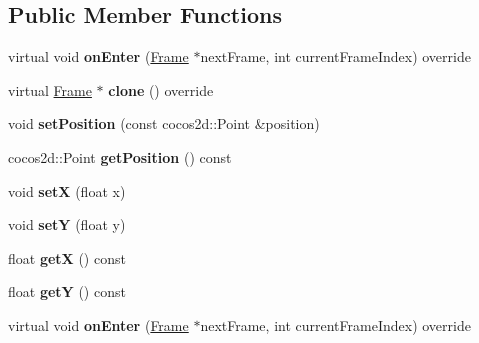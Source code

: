 \subsection*{Public Member Functions}
\begin{DoxyCompactItemize}
\item 
\mbox{\label{classPositionFrame_ab2594ff7025f4368f010583477339fc6}} 
virtual void {\bfseries on\+Enter} (\hyperlink{classFrame}{Frame} $\ast$next\+Frame, int current\+Frame\+Index) override
\item 
\mbox{\label{classPositionFrame_a46f25ea93cafa713ca0963824ae9755a}} 
virtual \hyperlink{classFrame}{Frame} $\ast$ {\bfseries clone} () override
\item 
\mbox{\label{classPositionFrame_a1b1d6c95709122a0136a1fefdb793109}} 
void {\bfseries set\+Position} (const cocos2d\+::\+Point \&position)
\item 
\mbox{\label{classPositionFrame_a31e1c5ecb13a1259067959afad4381c9}} 
cocos2d\+::\+Point {\bfseries get\+Position} () const
\item 
\mbox{\label{classPositionFrame_a7b86c2def22524f587b190825d9c48eb}} 
void {\bfseries setX} (float x)
\item 
\mbox{\label{classPositionFrame_a35b5929abf5915ca401d7031b766c441}} 
void {\bfseries setY} (float y)
\item 
\mbox{\label{classPositionFrame_aabe609493f938c6cafae2ff3058cca83}} 
float {\bfseries getX} () const
\item 
\mbox{\label{classPositionFrame_aebe0877116f91e36e43dcdc32447c5dc}} 
float {\bfseries getY} () const
\item 
\mbox{\label{classPositionFrame_ac3ad24429d2ea01733b87176bbdccf46}} 
virtual void {\bfseries on\+Enter} (\hyperlink{classFrame}{Frame} $\ast$next\+Frame, int current\+Frame\+Index) override
\item 
\mbox{\label{classPositionFrame_a95630971d8266847d523cc26ed248167}} 

\end{DoxyCompactItemize}
